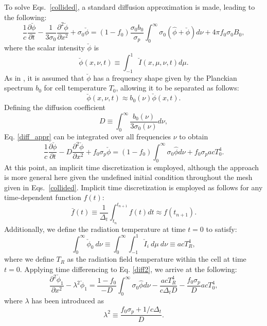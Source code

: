 To solve Eqs.\ \eqref{collided}, a standard diffusion approximation is
made, leading to the following:
\begin{equation}\label{diff_appr}
\frac{1}{c}\frac{\partial\breve\phi}{\partial t} -
  \frac{1}{3\sigma_0}\frac{\partial^2\breve\phi}{\partial x^2} +
  \sigma_0\breve\phi =
  (1-f_0)\frac{\sigma_0b_0}{\sigma_p}
    \int_0^\infty\sigma_0(\hat\phi+\breve\phi)d\nu +
  4\pi f_0\sigma_0B_0,
\end{equation}
where the scalar intensity $\breve\phi$ is
\[ \breve\phi(x,\nu,t)\equiv\int_{-1}^1\breve I(x,\mu,\nu,t)d\mu.\]
As in \cite{WolLarDen}, it is assumed that $\breve\phi$ has a frequency shape
given
by the Planckian spectrum $b_0$ for cell temperature $T_0$, allowing it to be
separated as follows:
\[\breve\phi(x,\nu,t)\approx b_0(\nu)\check\phi(x,t).\]
Defining the diffusion coefficient
\begin{equation}
D\equiv\int_0^\infty\frac{b_0(\nu)}{3\sigma_0(\nu)}d\nu,\label{defD}
\end{equation}
Eq. \eqref{diff_appr} can be integrated over all frequencies $\nu$ to
obtain
\begin{equation} \label{diff2}
\frac{1}{c}\frac{\partial\check\phi}{\partial t}
  -D\frac{\partial^2\check\phi}{\partial x^2} + f_0\sigma_p\check\phi
  =(1-f_0)\int_0^\infty\sigma_0\hat\phi d\nu + f_0\sigma_pacT^4_0.
\end{equation}
At this point, an implicit time discretization is
employed, although the approach is more general here given the undefined
initial condition throughout the mesh given in Eqs.\ \eqref{collided}. 
Implicit time discretization is employed as follows for any time-dependent
function $f(t)$:
\[ \bar f(t) \equiv\frac{1}{\Delta_t}\int_{t_n}^{t_{n+1}}f(t) dt 
  \approx f(t_{n+1}).\]
Additionally, we define the radiation temperature at time $t=0$ to satisfy:
\[ \int_0^\infty\check\phi_0\ d\nu\equiv\int_0^\infty\int_{-1}^1\check I_i\
d\mu\ d\nu \equiv acT_R^4,\]
where we define $T_R$ as the radiation field temperature within the cell at
time $t=0$.
Applying time differencing to Eq. \eqref{diff2}, we arrive at the
following:
\begin{equation}
\frac{\partial^2 \check\phi_1}{\partial x^2} - \lambda^2\check\phi_1 =
  \frac{1-f_0}{-D}\int_0^\infty \sigma_0\hat\phi d\nu -
  \frac{acT_R^4}{c\Delta_tD} - \frac{f_0\sigma_p}{D}acT_0^4,
\end{equation}
where $\lambda$ has been
introduced as
\[ \lambda^2\equiv\frac{f_0\sigma_p+1/c\Delta_t}{D}.\]

